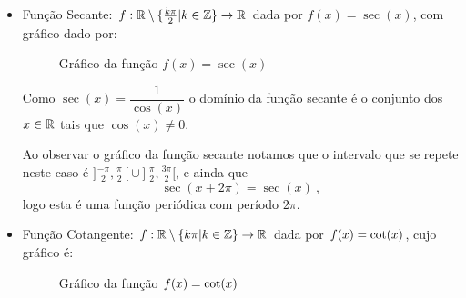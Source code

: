 \begin{itemize}
  Como $\csc(x)= \dfrac{1}{\sen(x)}$ o domínio da função cossecante é exatamente o conjunto dos $x \in \R$ tais que $\sen(x) \neq 0$.

  Ao observar o gráfico da função cossecante notamos que o gráfico da função no intervalo $]0, \pi[ \cup ] \pi, 2 \pi[$ se repete indefinidamente, e ainda
  \[\csc(x + 2\pi)= \csc(x) \ , \]
  logo esta é uma função periódica, com período $2\pi$.

  \item Função Secante: $f: \mathbb{R} \setminus \{\frac{k\pi}{2} | k \in \mathbb{Z}\} \rightarrow \mathbb{R}$ dada por $f(x)= \sec(x)$, com gráfico dado por:

  \begin{figure}[H]
  \centering
    \caption{Gráfico da função $f(x)= \sec(x)$}
  \end{figure}

  Como $\sec(x)= \dfrac{1}{\cos (x)}$ o domínio da função secante é o conjunto dos $x \in \R$ tais que $\cos(x) \neq 0$.

  Ao observar o gráfico da função secante notamos que o intervalo que se repete neste caso é $]\frac{-\pi}{2}, \frac{\pi}{2}[ \cup ] \frac{\pi}{2}, \frac{3\pi}{2}[$, e ainda que
  \[\sec(x + 2\pi)= \sec(x) \ ,\]
  logo esta é uma função periódica com período $2\pi$.

  \item Função Cotangente: $f: \mathbb{R} \setminus \{ k\pi | k \in \mathbb{Z}\} \rightarrow \mathbb{R}$ dada por $f(x)= \operatorname{cot}(x)$, cujo gráfico é:

  \begin{figure}[H]
  \centering
    \caption{Gráfico da função $f(x)= \operatorname{cot}(x)$}
  \end{figure}


\end{itemize}
